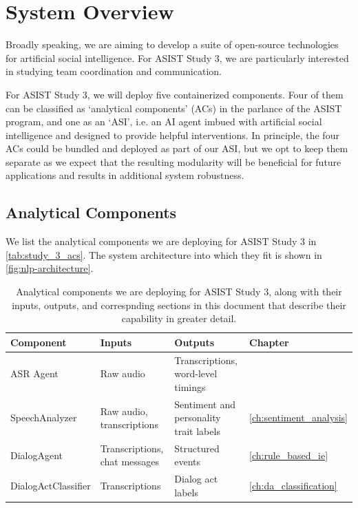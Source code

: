 \chapter{System Overview}
\label{ch:system}

Broadly speaking, we are aiming to develop a suite of open-source technologies
for artificial social intelligence. For ASIST Study 3, we are particularly
interested in studying team coordination and communication.

For ASIST Study 3, we will deploy five containerized components. Four of them
can be classified as `analytical components' (ACs) in the parlance of the ASIST
program, and one as an `ASI', i.e. an AI agent imbued with artificial social
intelligence and designed to provide helpful interventions. In principle, the
four ACs could be bundled and deployed as part of our ASI, but we opt to keep
them separate as we expect that the resulting modularity will be beneficial for
future applications and results in additional system robustness.


\section{Analytical Components}

We list the analytical components we are deploying for ASIST Study 3 in
\autoref{tab:study_3_acs}. The system architecture into which they fit is shown
in \autoref{fig:nlp-architecture}.

\begin{table}
    \small
    \begin{tabularx}{5.5in}{llXl}
        \toprule
        Component           & Inputs                        & Outputs                                & Chapter\\\midrule
        ASR Agent           & Raw audio                     & Transcriptions, word-level timings     & \\
        SpeechAnalyzer      & Raw audio, transcriptions     & Sentiment and personality trait labels & \autoref{ch:sentiment_analysis}\\
        DialogAgent         & Transcriptions, chat messages & Structured events                      & \autoref{ch:rule_based_ie}\\
        DialogActClassifier & Transcriptions                & Dialog act labels                      & \autoref{ch:da_classification}\\
        \bottomrule
    \end{tabularx}
    \caption{%
        Analytical components we are deploying for ASIST Study 3, along with
        their inputs, outputs, and correspnding sections in this document that
        describe their capability in greater detail.
    }
    \label{tab:study_3_acs}
\end{table}


